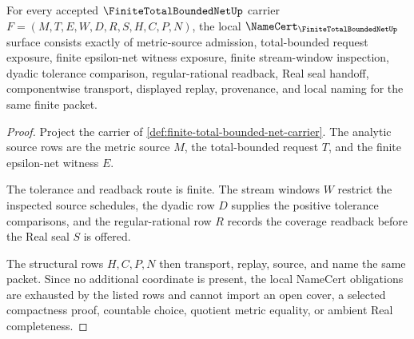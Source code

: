 \begin{theorem}
\label{thm:finite-total-bounded-net-namecert-obligations}
For every accepted $\FiniteTotalBoundedNetUp$ carrier $F=(M,T,E,W,D,R,S,H,C,P,N)$, the local $\NameCert_{\FiniteTotalBoundedNetUp}$ surface consists exactly of metric-source admission, total-bounded request exposure, finite epsilon-net witness exposure, finite stream-window inspection, dyadic tolerance comparison, regular-rational readback, Real seal handoff, componentwise transport, displayed replay, provenance, and local naming for the same finite packet.
\end{theorem}
\begin{proof}
Project the carrier of \autoref{def:finite-total-bounded-net-carrier}. The analytic source rows are the metric source $M$, the total-bounded request $T$, and the finite epsilon-net witness $E$.

The tolerance and readback route is finite. The stream windows $W$ restrict the inspected source schedules, the dyadic row $D$ supplies the positive tolerance comparisons, and the regular-rational row $R$ records the coverage readback before the Real seal $S$ is offered.

The structural rows $H,C,P,N$ then transport, replay, source, and name the same packet. Since no additional coordinate is present, the local NameCert obligations are exhausted by the listed rows and cannot import an open cover, a selected compactness proof, countable choice, quotient metric equality, or ambient Real completeness.
\end{proof}

